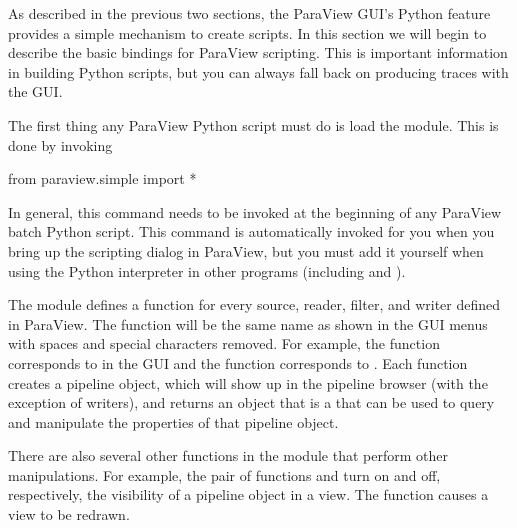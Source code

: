 As described in the previous two sections, the ParaView GUI's Python
 feature provides a simple mechanism to create scripts. In this
section we will begin to describe the basic bindings for ParaView
scripting. This is important information in building Python scripts, but
you can always fall back on producing traces with the GUI.

The first thing any ParaView Python script must do is load the
 module.  This is done by invoking
\begin{python}
from paraview.simple import *
\end{python}
In general, this command needs to be invoked at the beginning of any
ParaView batch Python script.  This command is automatically invoked for
you when you bring up the scripting dialog in ParaView, but you must add it
yourself when using the Python interpreter in other programs (including
 and ).


The  module defines a function for every source,
reader, filter, and writer defined in ParaView.  The function will be the
same name as shown in the GUI menus with spaces and special characters
removed.  For example, the  function corresponds to
 \ra {} in the GUI and the 
function corresponds to  \ra {} \ra {}.  Each function creates a pipeline object, which will show up
in the pipeline browser (with the exception of writers), and returns an
object that is a  that can be used to
query and manipulate the properties of that pipeline object.

There are also several other functions in the 
module that perform other manipulations.  For example, the pair of
functions  and  turn on and off, respectively,
the visibility of a pipeline object in a view.  The 
function causes a view to be redrawn.

